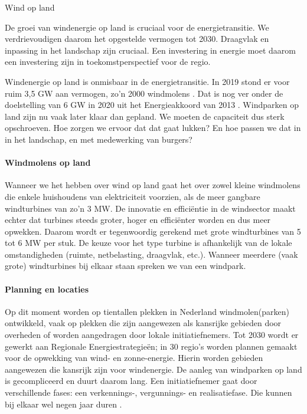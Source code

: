 \begin{voorstel}{Wind op land}

\begin{samenvatting}
De groei van windenergie op land is cruciaal voor de energietransitie. We verdrievoudigen daarom het opgestelde vermogen tot 2030. Draagvlak en inpassing in het landschap zijn cruciaal. Een investering in energie moet daarom een investering zijn in toekomstperspectief voor de regio.
\end{samenvatting}

\begin{multicols}{2}

\begin{uitdaging}
Windenergie op land is onmisbaar in de energietransitie. In 2019 stond er voor ruim 3,5 GW aan vermogen, zo’n 2000 windmolens \parencite{cbs_statline_nodate}. Dat is nog ver onder de doelstelling van 6 GW in 2020 uit het Energieakkoord van 2013 \parencite{rijksoverheid_windenergie_2016}. Windparken op land zijn nu vaak later klaar dan gepland. We moeten de capaciteit dus sterk opschroeven. Hoe zorgen we ervoor dat dat gaat lukken? En hoe passen we dat in in het landschap, en met medewerking van burgers?
\end{uitdaging}

\begin{overwegingen}
\paragraph{Windmolens op land}
Wanneer we het hebben over wind op land gaat het over zowel kleine windmolens die enkele huishoudens van elektriciteit voorzien, als de meer gangbare windturbines van zo'n 3 MW. De innovatie en efficiëntie in de windsector maakt echter dat turbines steeds groter, hoger en efficiënter worden en dus meer opwekken. Daarom wordt er tegenwoordig gerekend met grote windturbines van 5 tot 6 MW per stuk. De keuze voor het type turbine is afhankelijk van de lokale omstandigheden (ruimte, netbelasting, draagvlak, etc.). Wanneer meerdere (vaak grote) windturbines bij elkaar staan spreken we van een windpark.

\paragraph{Planning en locaties}
Op dit moment worden op tientallen plekken in Nederland windmolen(parken) ontwikkeld, vaak op plekken die zijn aangewezen als kansrijke gebieden door overheden of worden aangedragen door lokale initiatiefnemers. Tot 2030 wordt er gewerkt aan Regionale Energiestrategieën; in 30 regio’s worden plannen gemaakt voor de opwekking van wind- en zonne-energie. Hierin worden gebieden aangewezen die kansrijk zijn voor windenergie. De aanleg van windparken op land is gecompliceerd en duurt daarom lang. Een initiatiefnemer gaat door verschillende fases: een verkennings-, vergunnings- en realisatiefase. Die kunnen bij elkaar wel negen jaar duren \parencite{rijksdienst_voor_ondernemend_nederland_windenergie_nodate}.


\end{overwegingen}
\end{multicols}
\end{voorstel}
